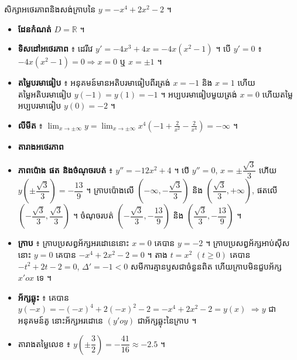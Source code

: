 \begin{example}[ឧទាហរណ៍]
សិក្សាអថេរភាពនិងសង់ក្រាបនៃ $y = -x^4 + 2x^2 - 2$ ។
\end{example}
\begin{itemize}
  \item \textbf{ដែនកំណត់} $D = \mathbb{R}$ ។
  \item \textbf{ទិសដៅអថេរភាព} ៖ ដេរីវេ $y' = -4x^3 + 4x = -4x(x^2 - 1)$ ។ បើ $y' = 0$ ៖ $-4x(x^2 - 1) = 0 \Rightarrow x = 0$ ឬ $x = \pm 1$ ។
  \begin{center}
  \end{center}
  \item \textbf{តម្លៃបរមាធៀប} ៖ អនុគមន៍មានអតិបរមាធៀបពីរត្រង់ $x = -1$ និង $x = 1$ ហើយតម្លៃអតិបរមាធៀប $y(-1) = y(1) = -1$ ។ អប្បបរមាធៀបមួយត្រង់ $x = 0$ ហើយតម្លៃអប្បបរមាធៀប $y(0) = -2$ ។
  \item \textbf{លីមីត} ៖ $\displaystyle\lim_{x \to \pm\infty} y = \lim_{x \to \pm\infty} x^4\left(-1 + \frac{2}{x^2} - \frac{2}{x^4}\right) = -\infty$ ។
  \item \textbf{តារាងអថេរភាព}
  \begin{center}
  \end{center}
  \item \textbf{ភាពប៉ោង ផត និងចំណុចរបត់} ៖ $y'' = -12x^2 + 4$ ។ បើ $y'' = 0$, $x = \pm\dfrac{\sqrt{3}}{3}$ ហើយ $y\left(\pm\dfrac{\sqrt{3}}{3}\right) = -\dfrac{13}{9}$ ។ ក្រាបប៉ោងលើ $\left(-\infty, -\dfrac{\sqrt{3}}{3}\right)$ និង $\left(\dfrac{\sqrt{3}}{3}, +\infty\right)$, ផតលើ $\left(-\dfrac{\sqrt{3}}{3}, \dfrac{\sqrt{3}}{3}\right)$ ។ ចំណុចរបត់ $\left(-\dfrac{\sqrt{3}}{3}, -\dfrac{13}{9}\right)$ និង $\left(\dfrac{\sqrt{3}}{3}, -\dfrac{13}{9}\right)$ ។
  \item \textbf{ក្រាប} ៖ ក្រាបប្រសព្វអ័ក្សអរដោនេនោះ $x = 0$ គេបាន $y = -2$ ។ ក្រាបប្រសព្វអ័ក្សអាប់ស៊ីសនោះ $y = 0$ គេបាន $-x^4 + 2x^2 - 2 = 0$ ។ តាង $t = x^2$ $(t \ge 0)$ គេបាន $-t^2 + 2t - 2 = 0$, $\Delta' = -1 < 0$ សមីការគ្មានឫសជាចំនួនពិត ហើយក្រាបមិនជួបអ័ក្ស $x'ox$ ទេ ។
  \item \textbf{អ័ក្សឆ្លុះ} ៖ គេបាន $y(-x) = -(-x)^4 + 2(-x)^2 - 2 = -x^4 + 2x^2 - 2 = y(x)$ $\Rightarrow y$ ជាអនុគមន៍គូ នោះអ័ក្សអរដោនេ $(y'oy)$ ជាអ័ក្សឆ្លុះនៃក្រាប ។
  \item តារាងតម្លៃលេខ ៖ $y\left(\pm\dfrac{3}{2}\right) = -\dfrac{41}{16} \approx -2.5$ ។
\end{itemize}

